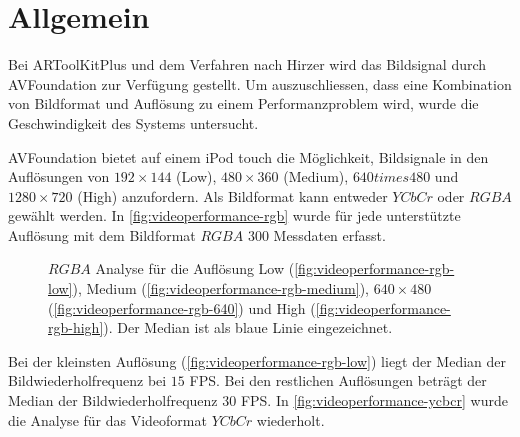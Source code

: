 \section{Allgemein} %
\label{sec:allgemein}

Bei ARToolKitPlus und dem Verfahren nach Hirzer wird das Bildsignal durch AVFoundation zur Verfügung gestellt. Um
 auszuschliessen, dass eine Kombination von Bildformat und Auflösung zu einem Performanzproblem wird, wurde die
 Geschwindigkeit des Systems untersucht.

AVFoundation bietet auf einem iPod touch die Möglichkeit, Bildsignale in den Auflösungen von $192 \times 144$ (Low),
 $480 \times 360$ (Medium), $640 times 480$ und $1280 \times 720$ (High) anzufordern. Als Bildformat kann entweder
 $\mathit{YCbCr}$ oder $\mathit{RGBA}$ gewählt werden. In \autoref{fig:videoperformance-rgb} wurde für jede unterstützte
 Auflösung mit dem Bildformat $\mathit{RGBA}$ $300$ Messdaten erfasst.
\begin{figure}[!ht]
	\centering
	\caption{$\mathit{RGBA}$ Analyse für die Auflösung Low (\autoref{fig:videoperformance-rgb-low}),
	 Medium (\autoref{fig:videoperformance-rgb-medium}), $640 \times 480$ (\autoref{fig:videoperformance-rgb-640}) und
	 High (\autoref{fig:videoperformance-rgb-high}). Der Median ist als blaue Linie eingezeichnet.}
	\label{fig:videoperformance-rgb}
\end{figure}
Bei der kleinsten Auflösung (\autoref{fig:videoperformance-rgb-low}) liegt der Median der Bildwiederholfrequenz bei $15$
 FPS. Bei den restlichen Auflösungen beträgt der Median der Bildwiederholfrequenz $30$ FPS. In
 \autoref{fig:videoperformance-ycbcr} wurde die Analyse für das Videoformat $\mathit{YCbCr}$ wiederholt.
